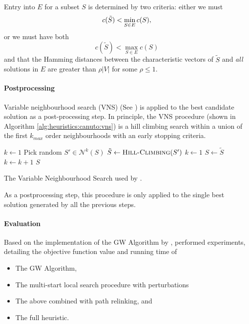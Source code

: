  Entry into $E$ for a subset $S$ is determined by two criteria:
 either we must
 \[c(\tilde{S}) < \min_{S \in E} c(S)\mathnormal{,}\]
 or we must have both
 \[c(\tilde{S}) < \max_{S \in E} c(S)\]
  and that the Hamming distances between the characteristic vectors of $\tilde{S}$
   and \textit{all} solutions in $E$ are greater than $\rho |V|$ for some $\rho \leq 1$. 

\paragraph{Postprocessing}
Variable neighbourhood search (VNS) (See \citet{hansen2010variable}) is applied
to the best candidate solution as a post-processing step. In principle, the VNS
procedure (shown in Algorithm \ref{alg:heuristics:canuto:vns}) is a hill climbing
search within a union of the first $k_{max}$ order neighbourhoods with an early stopping
 criteria.
\begin{algorithm}[h!]
   \begin{algorithmic}[1]
     \State $k \gets 1$
     \State Pick random $S' \in \mathcal{N}^k(S)$
     \State $\tilde{S} \gets \Call{Hill-Climbing}{S'}$
     \State $k \gets 1$
     \State $S \gets \tilde{S}$
     \Else
     \State $k \gets k + 1$
     \EndIf
     \EndWhile
     \EndFor
     \State \Return $S$
     \EndProcedure
 \end{algorithmic}
 \caption{The Variable Neighbourhood Search
   used by \citet{canuto2001local}.}\label{alg:heuristics:canuto:vns}
 \end{algorithm}

 As a postprocessing step, this procedure is only applied to the single best solution generated
  by all the previous steps.
\paragraph{Evaluation}
Based on the implementation of the GW Algorithm by \citet{Johnson:2000:PCS:338219.338637},
\citet{canuto2001local} performed experiments, detailing the objective function value
and running time of
\begin{itemize}
\item The GW Algorithm,
\item The multi-start local search procedure with perturbations
\item The above combined with path relinking, and
\item The full heuristic.
\end{itemize}

